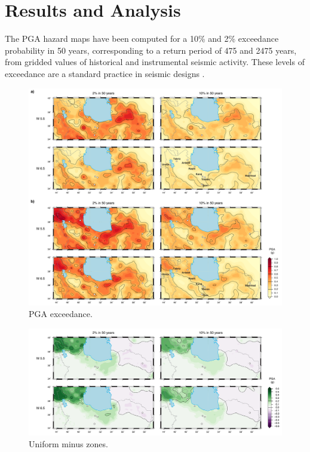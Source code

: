
\section{Results and Analysis}

The PGA hazard maps have been computed for a 10\% and 2\% exceedance probability in 50 years, corresponding to a return period of 475 and 2475 years, from gridded values of historical and instrumental seismic activity. These levels of exceedance are a standard practice in seismic designs \citep{BHRC2014}.

\begin{figure}[t]
    \centering
    \includegraphics[width=\textwidth]{figures/pdf/figure-08.pdf} 
    \caption{PGA exceedance.}
    \label{fig:pga}
\end{figure}

\begin{figure}[t]
    \centering
    \includegraphics[width=\textwidth]{figures/pdf/figure-09.pdf} 
    \caption{Uniform minus zones.}
    \label{fig:pga}
\end{figure}

